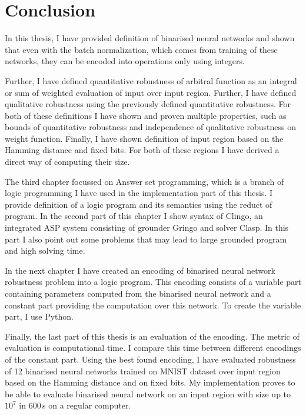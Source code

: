 \chapter*{Conclusion}
In this thesis, I have provided definition of binarised neural networks
and shown that even with the batch normalization, which comes from training of these
networks, they can be encoded into operations only using integers.

Further, I have defined quantitative robustness of arbitral function
as an integral or sum of weighted evaluation of input over input region.
Further, I have defined qualitative robustness using the previously defined
quantitative robustness. For both of these definitions I have shown and proven
multiple properties, such as bounds of quantitative robustness and independence
of qualitative robustness on weight function.
Finally, I have shown definition of input region based on the Hamming distance
and fixed bits. For both of these regions I have derived a direct way
of computing their size.

The third chapter focussed on Answer set programming, which is a branch of logic programming
I have used in the implementation part of this thesis.
I provide definition of a logic program and its semantics using the reduct of program.
In the second part of this chapter I show syntax of Clingo, an integrated ASP system
consisting of grounder Gringo and solver Clasp. In this part I also point out
some problems that may lead to large grounded program and high solving time.

In the next chapter I have created an encoding of binarised neural network
robustness problem
into a logic program. This encoding consists of a variable part containing
parameters computed from the binarised neural network and a constant part
providing the computation over this network.
To create the variable part, I use Python.

Finally, the last part of this thesis is an evaluation of the encoding.
The metric of evaluation is computational time. I compare this time between
different encodings of the constant part. Using the best found encoding,
I have evaluated robustness of 12 binarised neural networks trained on MNIST dataset
over input region based on the Hamming distance and on fixed bits.
My implementation proves to be able to evaluate binarised neural network
on an input region with size up to $10^7$ in 600\,s on a regular computer.

